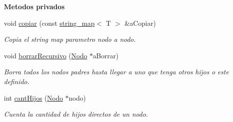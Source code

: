 \begin{Indent}{\bf Metodos privados}
\begin{DoxyCompactItemize}
void \hyperlink{classstring__map_a4b4ffdd6ad5ade098c3667ab3c80746b}{copiar} (const \hyperlink{classstring__map}{string\+\_\+map}$<$ T $>$ \&a\+Copiar)
\begin{DoxyCompactList}\small\item\em Copia el string map parametro nodo a nodo. \end{DoxyCompactList}\item 
void \hyperlink{classstring__map_a2bc06097a8b42763d4556450db59c4da}{borrar\+Recursivo} (\hyperlink{structstring__map_1_1Nodo}{Nodo} $\ast$a\+Borrar)
\begin{DoxyCompactList}\small\item\em Borra todos los nodos padres hasta llegar a uno que tenga otros hijos o este definido. \end{DoxyCompactList}\item 
int \hyperlink{classstring__map_ac6a88a22faefe94a12ad9f78c047203d}{cant\+Hijos} (\hyperlink{structstring__map_1_1Nodo}{Nodo} $\ast$nodo)
\begin{DoxyCompactList}\small\item\em Cuenta la cantidad de hijos directos de un nodo. \end{DoxyCompactList}\end{DoxyCompactItemize}
\end{Indent}
